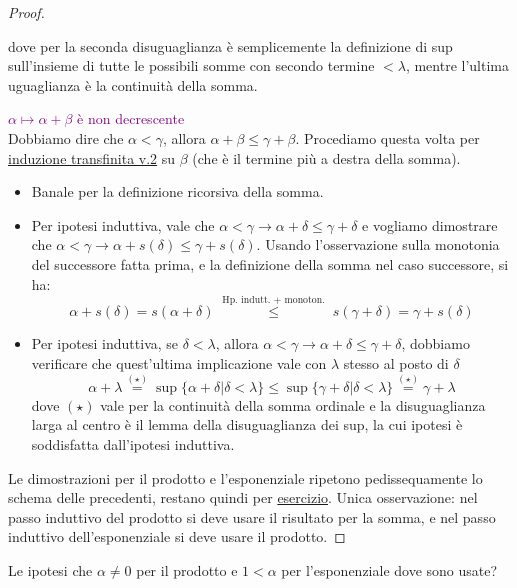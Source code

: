 \begin{proof}
\begin{itemize}
\[			\]
		dove per la seconda disuguaglianza \`e semplicemente la definizione di sup sull'insieme di tutte le possibili somme con secondo termine $<\lambda$, mentre l'ultima uguaglianza \`e la continuit\`a della somma.
		\end{itemize}
	\textcolor{purple}{$\alpha \mapsto \alpha + \beta$ \`e non decrescente}\\
	Dobbiamo dire che $\alpha < \gamma$, allora $\alpha + \beta \leq \gamma + \beta$. Procediamo questa volta per \hyperref[induz_transf2]{induzione transfinita v.2} su $\beta$ (che \`e il termine pi\`u a destra della somma).
	\begin{itemize}
		\item[$\boxed{\text{caso $\beta = 0$}}$] Banale per la definizione ricorsiva della somma.
		\item[$\boxed{\text{caso $\beta = s(\delta)$}}$] Per ipotesi induttiva, vale che $\alpha < \gamma \rightarrow \alpha + \delta \leq \gamma + \delta$ e vogliamo dimostrare che $\alpha < \gamma \to \alpha + s(\delta) \leq \gamma + s(\delta)$.
		Usando l'osservazione sulla monotonia del successore fatta prima, e la definizione della somma nel caso successore, si ha:
		\[ \alpha + s(\delta) = s(\alpha + \delta) \;\overset{\text{Hp. indutt. + monoton.}}{\leq}\; s(\gamma + \delta) = \gamma + s(\delta)
			\]
		\item[$\boxed{\text{caso $\beta = \lambda$ limite}}$] Per ipotesi induttiva, se $\delta < \lambda$, allora $\alpha < \gamma \rightarrow \alpha + \delta \leq \gamma + \delta$, dobbiamo verificare che quest'ultima implicazione vale con $\lambda$ stesso al posto di $\delta$
		\[ \alpha + \lambda \overset{(\star)}{=} \sup \{\alpha + \delta | \delta < \lambda\} \leq \sup\{\gamma + \delta | \delta < \lambda\} \overset{(\star)}{=} \gamma + \lambda
			\]
		dove $(\star)$ vale per la continuit\`a della somma ordinale e la disuguaglianza larga al centro \`e il lemma della disuguaglianza dei sup, la cui ipotesi \`e soddisfatta dall'ipotesi induttiva.
	\end{itemize}
	Le dimostrazioni per il prodotto e l'esponenziale ripetono pedissequamente lo schema delle precedenti, restano quindi per \underline{esercizio}. Unica osservazione:
	nel passo induttivo del prodotto si deve usare il risultato per la somma, e nel passo induttivo dell'esponenziale si deve usare il prodotto.
\end{proof}

\begin{exercise}
	Le ipotesi che $\alpha \ne 0$ per il prodotto e $1 < \alpha$ per l'esponenziale dove sono usate?
\end{exercise}

